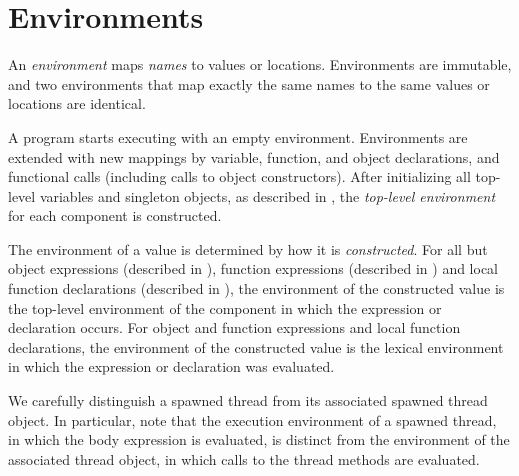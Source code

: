 %
%
%
%

\section{Environments}

An \emph{environment} maps \emph{names} to values or locations.
Environments are immutable,
and two environments that map exactly the same names
to the same values or locations are identical.


A program starts executing with an empty environment.
Environments are extended with new mappings
by variable, function, and object declarations, and functional calls
(including calls to object constructors).
After initializing all top-level variables and singleton objects,
as described in ,
the \emph{top-level environment} for each component is constructed.

The environment of a value is determined by how it is
\emph{constructed}.
For all but object expressions (described in ),
function expressions (described in )
and local function declarations (described in ),
the environment of the constructed value is the top-level environment of the component in which the expression or declaration occurs.
For object and function expressions and local function declarations,
the environment of the constructed value
is the lexical environment in which the expression or declaration was evaluated.

We carefully distinguish a spawned thread from its associated spawned
thread object.  In particular, note that the execution environment of
a spawned thread, in which the body expression is evaluated, is
distinct from the environment of the associated thread object, in
which calls to the thread methods are evaluated.
